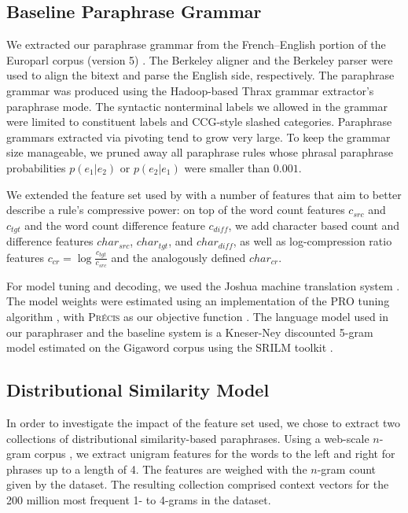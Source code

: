 \documentclass[11pt]{article}
\begin{document}
\subsection{Baseline Paraphrase Grammar}

We extracted our paraphrase grammar from the French--English portion
of the Europarl corpus (version 5) \cite{koehn2005europarl}. The
Berkeley aligner and the Berkeley parser were used to align the bitext
and parse the English side, respectively. The paraphrase grammar was
produced using the Hadoop-based Thrax grammar extractor's paraphrase
mode. The syntactic nonterminal labels we allowed in the grammar were
limited to constituent labels and CCG-style slashed
categories. Paraphrase grammars extracted via pivoting tend to grow
very large. To keep the grammar size manageable, we pruned away all
paraphrase rules whose phrasal paraphrase probabilities $p(e_1|e_2)$
or $p(e_2|e_1)$ were smaller than $0.001$.

We extended the feature set used by  with a
number of features that aim to better describe a rule's compressive
power: on top of the word count features $c_{\mathit{src}}$ and
$c_{\mathit{tgt}}$ and the word count difference feature
$c_{\mathit{diff}}$, we add character based count and difference
features $\mathit{char}_{\mathit{src}}$,
$\mathit{char}_{\mathit{tgt}}$, and $\mathit{char}_{\mathit{diff}}$,
as well as log-compression ratio features $c_{\mathit{cr}} = \log
\frac{c_{\mathit{tgt}}}{c_{\mathit{src}}}$ and the analogously defined
$\mathit{char}_{\mathit{cr}}$.

For model tuning and decoding, we used the Joshua machine translation
system \cite{Joshua-3.0}. The model weights were estimated using an
implementation of the PRO tuning algorithm \cite{PRO2011}, with
\textsc{Pr\'ecis} as our objective function \cite{Ganitkevitch2011}.  The
language model used in our paraphraser and the 
baseline system is a Kneser-Ney discounted 5-gram model estimated on
the Gigaword corpus using the SRILM toolkit \cite{SRILM}.


\subsection{Distributional Similarity Model}\label{distributional-similarity-model}
In order to investigate the impact of the feature set used, we chose
to extract two collections of distributional similarity-based
paraphrases. Using a web-scale $n$-gram corpus
\cite{GoogleNgrams,LinEtAlLREC10}, we extract unigram features for the
words to the left and right for phrases up to a length of 4. The
features are weighed with the $n$-gram count given by the dataset. The
resulting collection comprised context vectors for the 200 million
most frequent 1- to 4-grams in the dataset.
\end{document}
